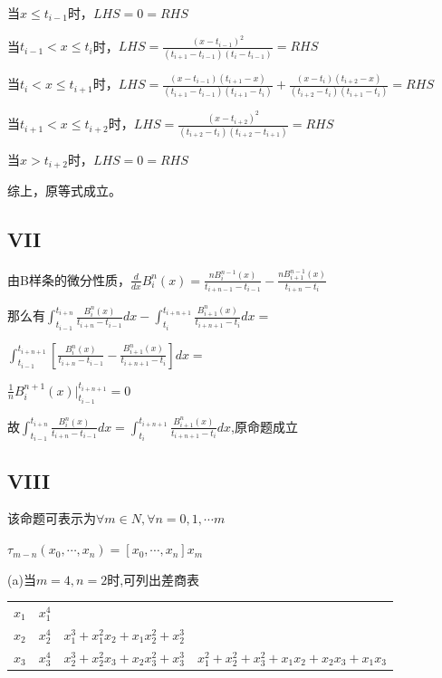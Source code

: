 \documentclass[12]{article}%
\begin{document}
        当$x\le t_{i-1}$时，$LHS=0=RHS$

        当$t_{i-1}<x\le t_{i}$时，$LHS=\frac{(x-t_{i-1})^2}{(t_{i+1}-t_{i-1})(t_{i}-t_{i-1})}=RHS$

        当$t_i<x\le t_{i+1}$时，$LHS=\frac{(x-t_{i-1})(t_{i+1}-x)}{(t_{i+1}-t_{i-1})(t_{i+1}-t_{i})}+\frac{(x-t_{i})(t_{i+2}-x)}{(t_{i+2}-t_{i})(t_{i+1}-t_{i})}=RHS$

        当$t_{i+1}<x\le t_{i+2}$时，$LHS=\frac{(x-t_{i+2})^2}{(t_{i+2}-t_{i})(t_{i+2}-t_{i+1})}=RHS$

        当$x> t_{i+2}$时，$LHS=0=RHS$

        综上，原等式成立。
            

        \subsection{VII}
            由B样条的微分性质，$\frac{d}{dx}B_i^n(x)=\frac{nB^{n-1}_i(x)}{t_{i+n-1}-t_{i-1}}-\frac{nB^{n-1}_{i+1}(x)}{t_{i+n}-t_{i}}$

            那么有$\int_{t_{i-1}}^{t_{i+n}}\frac{B^n_i(x)}{t_{i+n}-t_{i-1}}dx-\int_{t_{i}}^{t_{i+n+1}}\frac{B^n_{i+1}(x)}{t_{i+n+1}-t_{i}}dx=$

            $\int_{t_{i-1}}^{t_{i+n+1}}[\frac{B^n_i(x)}{t_{i+n}-t_{i-1}}-\frac{B^n_{i+1}(x)}{t_{i+n+1}-t_{i}}]dx=$
            
            $\frac{1}{n}B^{n+1}_i(x)|_{t_{i-1}}^{t_{i+n+1}}=0$ 
            
            故$\int_{t_{i-1}}^{t_{i+n}}\frac{B^n_i(x)}{t_{i+n}-t_{i-1}}dx=\int_{t_{i}}^{t_{i+n+1}}\frac{B^n_{i+1}(x)}{t_{i+n+1}-t_{i}}dx$,原命题成立
        \subsection{VIII}
            该命题可表示为$\forall m \in N ,\forall n=0,1,\cdots m$

            $\tau_{m-n}(x_0,\cdots,x_n)=[x_0,\cdots,x_n]x_m$

            (a)当$m=4,n=2$时,可列出差商表

            \begin{tabular}{c|c|c|c}
                $x_1 $& $x_1^4$  \\
                $x_2$ & $x_2^4$  & $x_1^3+x_1^2x_2+x_1x_2^2+x_2^3$ \\
                $x_3$ & $x_3^4$  & $x_2^3+x_2^2x_3+x_2x_3^2+x_3^3$ & $x_1^2+x_2^2+x_3^2+x_1x_2+x_2x_3+x_1x_3$ \\
            \end{tabular}
\end{document}
